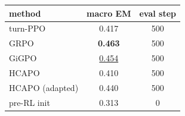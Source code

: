 \begin{tabular}{lcc}
\toprule
method & macro EM & eval step \\
\midrule
turn-PPO & 0.417 & 500 \\
GRPO & \textbf{0.463} & 500 \\
GiGPO & \underline{0.454} & 500 \\
HCAPO & 0.410 & 500 \\
HCAPO (adapted) & 0.440 & 500 \\
pre-RL init & 0.313 & 0 \\
\bottomrule
\end{tabular}
